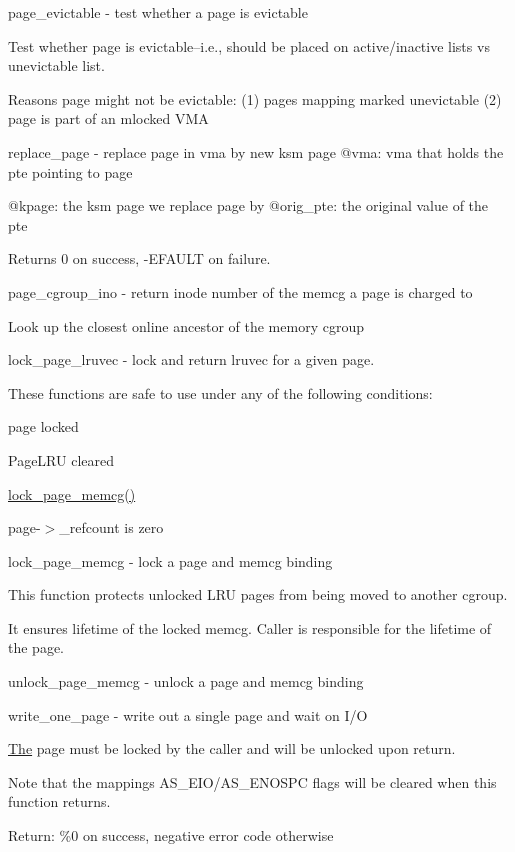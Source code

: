 page\+\_\+evictable -\/ test whether a page is evictable

Test whether page is evictable--i.\+e., should be placed on active/inactive lists vs unevictable list.

Reasons page might not be evictable\+: (1) page\textquotesingle{}s mapping marked unevictable (2) page is part of an mlocked V\+MA

replace\+\_\+page -\/ replace page in vma by new ksm page @vma\+: vma that holds the pte pointing to page

@kpage\+: the ksm page we replace page by @orig\+\_\+pte\+: the original value of the pte

Returns 0 on success, -\/E\+F\+A\+U\+LT on failure.

page\+\_\+cgroup\+\_\+ino -\/ return inode number of the memcg a page is charged to

Look up the closest online ancestor of the memory cgroup

lock\+\_\+page\+\_\+lruvec -\/ lock and return lruvec for a given page.

These functions are safe to use under any of the following conditions\+:
\begin{DoxyItemize}
\item page locked
\item Page\+L\+RU cleared
\item \mbox{\hyperlink{memcontrol_8c_a0c77f273151d224eb55f369aa825d348}{lock\+\_\+page\+\_\+memcg()}}
\item page-\/$>$\+\_\+refcount is zero
\end{DoxyItemize}

lock\+\_\+page\+\_\+memcg -\/ lock a page and memcg binding

This function protects unlocked L\+RU pages from being moved to another cgroup.

It ensures lifetime of the locked memcg. Caller is responsible for the lifetime of the page.

unlock\+\_\+page\+\_\+memcg -\/ unlock a page and memcg binding

write\+\_\+one\+\_\+page -\/ write out a single page and wait on I/O

\mbox{\hyperlink{classThe}{The}} page must be locked by the caller and will be unlocked upon return.

Note that the mapping\textquotesingle{}s A\+S\+\_\+\+E\+I\+O/\+A\+S\+\_\+\+E\+N\+O\+S\+PC flags will be cleared when this function returns.

Return\+: \%0 on success, negative error code otherwise


